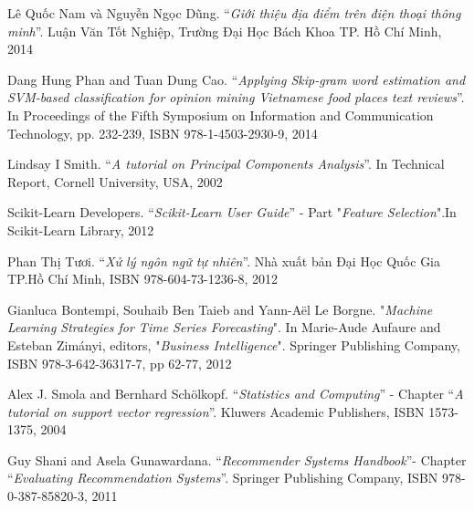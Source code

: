 \documentclass[12pt]{extarticle}
\begin{document}
\begin{enumerate}[label={[\arabic*]}]
	\item Lê Quốc Nam và Nguyễn Ngọc Dũng. “\textit{Giới thiệu địa điểm trên điện thoại thông minh}”. Luận Văn Tốt Nghiệp, Trường Đại Học Bách Khoa TP. Hồ Chí Minh, 2014
	\item Dang Hung Phan and Tuan Dung Cao. “\textit{Applying Skip-gram word estimation and SVM-based classification for opinion mining Vietnamese food places text reviews}”. In Proceedings of the Fifth Symposium on Information and Communication Technology, pp. 232-239, ISBN 978-1-4503-2930-9, 2014
	\item Lindsay I Smith. “\textit{A tutorial on Principal Components Analysis}”. In Technical Report, Cornell University, USA, 2002
	\item Scikit-Learn Developers. “\textit{Scikit-Learn User Guide}” - Part "\textit{Feature Selection}".In Scikit-Learn Library, 2012
	\item Phan Thị Tươi. “\textit{Xử lý ngôn ngữ tự nhiên}”. Nhà xuất bản Đại Học Quốc Gia TP.Hồ Chí Minh, ISBN 978-604-73-1236-8, 2012
	\item Gianluca Bontempi, Souhaib Ben Taieb and Yann-Aël Le Borgne. "\textit{Machine Learning Strategies for Time Series Forecasting}". In Marie-Aude Aufaure and Esteban Zimányi, editors, "\textit{Business Intelligence}". Springer Publishing Company, ISBN 978-3-642-36317-7, pp 62-77, 2012
	\item Alex J. Smola and Bernhard Schölkopf. “\textit{Statistics and Computing}” - Chapter “\textit{A tutorial on support vector regression}”. Kluwers Academic Publishers, ISBN 1573-1375, 2004
	\item Guy Shani and Asela Gunawardana. “\textit{Recommender Systems Handbook}”- Chapter “\textit{Evaluating Recommendation Systems}”. Springer Publishing Company, ISBN 978-0-387-85820-3, 2011
\end{enumerate}
\end{document}

